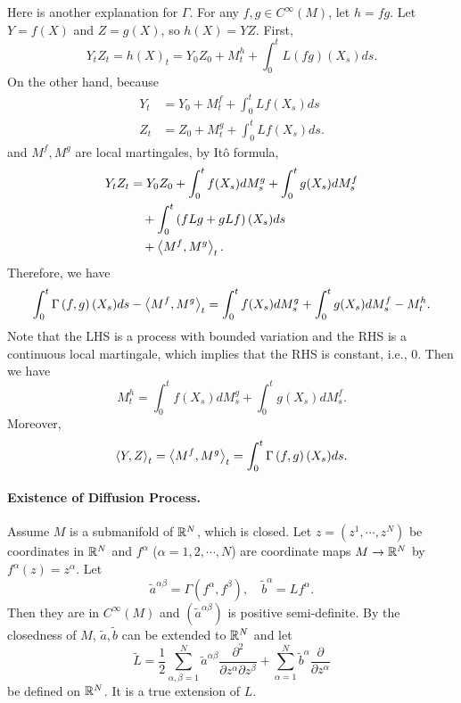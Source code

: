 Here is another explanation for $\Gamma$. For any $f,g \in C^\infty(M)$, let $h = fg$. Let $Y = f(X)$ and $Z = g(X)$, so $h(X) = YZ$. First,
\begin{equation*}
    Y_tZ_t = h(X)_t = Y_0Z_0 + M^h_t + \int_0^tL(fg)(X_s)ds.
\end{equation*}
On the other hand, because
\begin{align*}
    Y_t &= Y_0 + M^f_t + \int_0^tLf(X_s)ds \\
    Z_t &= Z_0 + M^g_t + \int_0^tLf(X_s)ds.
\end{align*}
and $M^f,M^g$ are local martingales, by It\^o formula,
\begin{align*}
    Y_tZ_t &= Y_0Z_0 + \int_0^tf(X_s)dM^g_s + \int_0^tg(X_s)dM^f_s \\
    &\quad +\int_0^t\left(fLg + gLf\right)(X_s)ds \\
    &\quad + \left\langle M^f,M^g \right\rangle_t. 
\end{align*}
Therefore, we have
\begin{equation*}
    \int_0^t\Gamma\left(f,g\right)(X_s)ds - \left\langle M^f,M^g \right\rangle_t = \int_0^tf(X_s)dM^g_s + \int_0^tg(X_s)dM^f_s - M^h_t.
\end{equation*}
Note that the LHS is a process with bounded variation and the RHS is a continuous local martingale, which implies that the RHS is constant, i.e., $0$. Then we have
\begin{equation*}
    M^h_t = \int_0^tf(X_s)dM^g_s + \int_0^tg(X_s)dM^f_s.
\end{equation*}
Moreover,
\begin{equation*}
    \left\langle Y,Z \right\rangle_t = \left\langle M^f,M^g \right\rangle_t = \int_0^t\Gamma\left(f,g\right)(X_s)ds.
\end{equation*}

\paragraph{Existence of Diffusion Process.} Assume $M$ is a submanifold of $\mathbb{R}^N$, which is closed. Let $z = (z^1,\cdots,z^N)$ be coordinates in $\mathbb{R}^N$ and $f^\alpha$ ($\alpha = 1,2,\cdots, N$) are coordinate maps $M \rightarrow \mathbb{R}^N$ by $f^\alpha(z) = z^\alpha$. Let
\begin{equation*}
    \tilde{a}^{\alpha \beta} = \Gamma(f^\alpha,f^\beta),\quad \tilde{b}^\alpha = Lf^\alpha.
\end{equation*}
Then they are in $C^\infty(M)$ and $(\tilde{a}^{\alpha \beta})$ is positive semi-definite. By the closedness of $M$, $\tilde{a},\tilde{b}$ can be extended to $\mathbb{R}^N$ and let
\begin{equation*}
    \tilde{L}=\frac{1}{2} \sum_{\alpha, \beta=1}^N \tilde{a}^{\alpha \beta} \frac{\partial^2}{\partial z^\alpha \partial z^\beta}+\sum_{\alpha=1}^N \tilde{b}^\alpha \frac{\partial}{\partial z^\alpha}
\end{equation*}
be defined on $\mathbb{R}^N$. It is a true extension of $L$.

